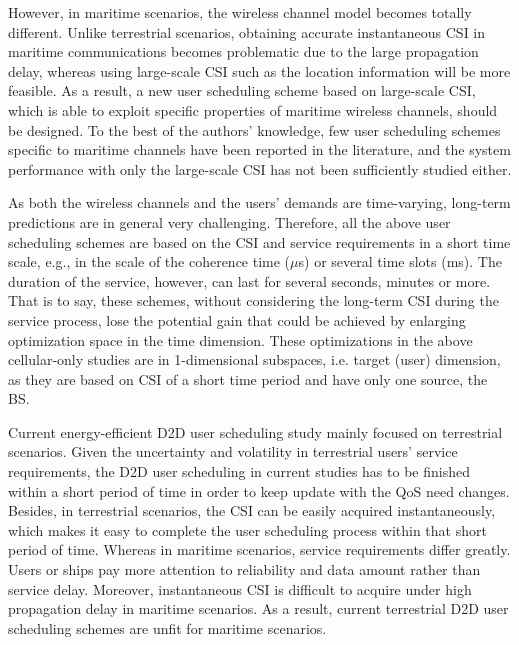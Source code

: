 \documentclass{ieeeaccess}
\begin{document}

However, in maritime scenarios, the wireless channel model becomes totally different. Unlike terrestrial scenarios, obtaining accurate instantaneous CSI in maritime communications becomes problematic due to the large propagation delay, whereas using large-scale CSI such as the location information will be more feasible. As a result, a new user scheduling scheme based on large-scale CSI, which is able to exploit specific properties of maritime wireless channels, should be designed. To the best of the authors' knowledge, few user scheduling schemes specific to maritime channels have been reported in the literature, and the system performance with only the large-scale CSI has not been sufficiently studied either. 

As both the wireless channels and the users' demands are time-varying, long-term predictions are in general very challenging. Therefore, all the above user scheduling schemes are based on the CSI and service requirements in a short time scale, e.g., in the scale of the coherence time ($\mu$s) or several time slots (ms). The duration of the service, however, can last for several seconds, minutes or more. That is to say, these schemes, without considering the long-term CSI during the service process, lose the potential gain that could be achieved by enlarging optimization space in the time dimension. These optimizations in the above cellular-only studies are in 1-dimensional subspaces, i.e. target (user) dimension, as they are based on CSI of a short time period and have only one source, the BS. 

Current energy-efficient D2D user scheduling study mainly focused on terrestrial scenarios. Given the uncertainty and volatility in terrestrial users' service requirements, the D2D user scheduling in current studies has to be finished within a short period of time in order to keep update with the QoS need changes. Besides, in terrestrial scenarios, the CSI can be easily acquired instantaneously, which makes it easy to complete the user scheduling process within that short period of time. 
Whereas in maritime scenarios, service requirements differ greatly. Users or ships pay more attention to reliability and data amount rather than service delay. Moreover, instantaneous CSI is difficult to acquire under high propagation delay in maritime scenarios. As a result, current terrestrial D2D user scheduling schemes are unfit for maritime scenarios. 
\end{document}
